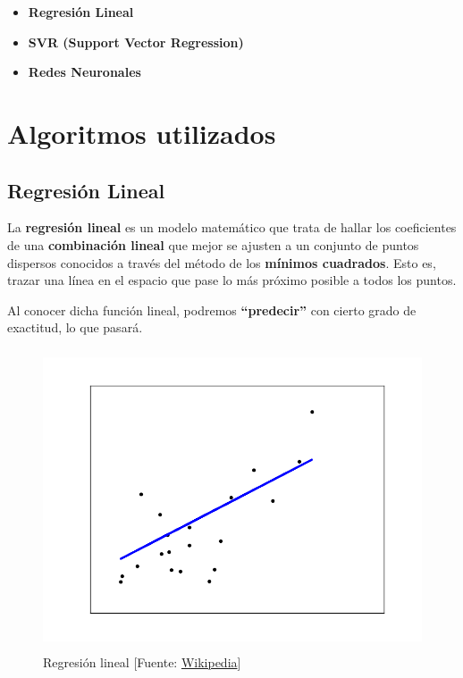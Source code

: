 	\begin{itemize}
	\item \textbf{Regresión Lineal} 
	\item \textbf{SVR (Support Vector Regression)} 
	\item \textbf{Redes Neuronales} 
\end{itemize}


\section{Algoritmos utilizados}
\label{makereference4.2}
	\subsection{Regresión Lineal}
	\label{makereference4.2.1}

	La \textbf{regresión lineal} es un modelo matemático que trata de hallar los coeficientes de una \textbf{combinación lineal} que mejor se ajusten a un conjunto de puntos dispersos conocidos a través del método de los \textbf{mínimos cuadrados}. Esto es, trazar una línea en el espacio que pase lo más próximo posible a todos los puntos.

	Al conocer dicha función lineal, podremos \textbf{``predecir''} con cierto grado de exactitud, lo que pasará.

	\begin{figure}[htb]
		\begin{center}
			\includegraphics[height=3.5in]{figures/regression.png}
			\caption{Regresión lineal [Fuente: \href{www.wikipedia.org}{Wikipedia}]}
		\end{center}
		\label{regression}
	\end{figure}
	
